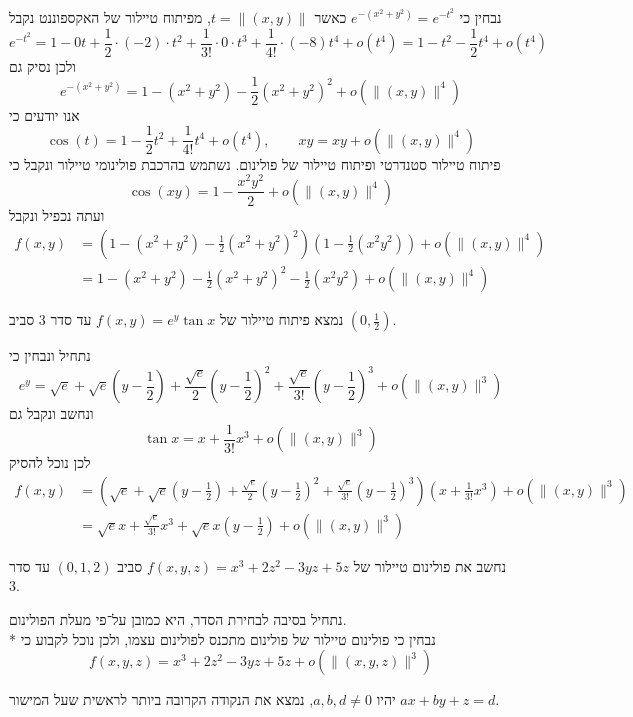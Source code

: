 נבחין כי $e^{-(x^2 + y^2)} = e^{-t^2}$ כאשר $t = \lVert (x, y) \rVert$, מפיתוח טיילור של האקספוננט נקבל
\[
	e^{-t^2} = 1 - 0 t + \frac{1}{2} \cdot (-2) \cdot t^2 + \frac{1}{3!} \cdot 0 \cdot t^3 + \frac{1}{4!} \cdot (-8) t^4 + o(t^4)
	= 1 - t^2 - \frac{1}{2} t^4 + o(t^4)
\]
ולכן נסיק גם
\[
	e^{-(x^2+y^2)} = 1 - (x^2 + y^2) - \frac{1}{2} {(x^2 + y^2)}^2 + o(\lVert (x, y) \rVert^4)
\]
אנו יודעים כי
\[
	\cos(t) = 1 - \frac{1}{2} t^2 + \frac{1}{4!} t^4 + o(t^4),
	\qquad
	xy = xy + o(\lVert (x, y) \rVert^4)
\]
פיתוח טיילור סטנדרטי ופיתוח טיילור של פולינום.
נשתמש בהרכבת פולינומי טיילור ונקבל כי
\[
	\cos(xy) = 1 - \frac{x^2 y^2}{2} + o(\lVert (x, y) \rVert^4)
\]
ועתה נכפיל ונקבל
\begin{align*}
	f(x, y)
	& = (1 - (x^2 + y^2) - \frac{1}{2} {(x^2 + y^2)}^2)(1 - \frac{1}{2}(x^2y^2)) + o(\lVert (x, y) \rVert^4) \\
	& = 1 - (x^2 + y^2) - \frac{1}{2} {(x^2 + y^2)}^2 - \frac{1}{2}(x^2y^2) + o(\lVert (x, y) \rVert^4)
\end{align*}

\Subquestion{}
נמצא פיתוח טיילור של $f(x, y) = e^y \tan x$ עד סדר $3$ סביב $(0, \frac{1}{2})$.

נתחיל ונבחין כי
\[
	e^y = \sqrt{e} + \sqrt{e} (y - \frac{1}{2}) + \frac{\sqrt{e}}{2} {(y - \frac{1}{2})}^2 + \frac{\sqrt{e}}{3!} {(y - \frac{1}{2})}^3 + o(\lVert (x, y) \rVert^3)
\]
ונחשב ונקבל גם
\[
	\tan x = x + \frac{1}{3!} x^3 + o(\lVert (x, y) \rVert^3)
\]
לכן נוכל להסיק
\begin{align*}
	f(x, y)
	& = (\sqrt{e} + \sqrt{e} (y - \frac{1}{2}) + \frac{\sqrt{e}}{2} {(y - \frac{1}{2})}^2 + \frac{\sqrt{e}}{3!} {(y - \frac{1}{2})}^3)(x + \frac{1}{3!} x^3) + o(\lVert (x, y) \rVert^3) \\
	& = \sqrt{e} x + \frac{\sqrt{e}}{3!} x^3 + \sqrt{e} x (y - \frac{1}{2}) + o(\lVert (x, y) \rVert^3)
\end{align*}

\Subquestion{}
נחשב את פולינום טיילור של $f(x, y, z) = x^3 + 2z^2 - 3yz + 5z$ סביב $(0, 1, 2)$ עד סדר $3$.

נתחיל בסיבה לבחירת הסדר, היא כמובן על־פי מעלת הפולינום. \\*
נבחין כי פולינום טיילור של פולינום מתכנס לפולינום עצמו, ולכן נוכל לקבוע כי
\[
	f(x, y, z) = x^3 + 2z^2 - 3yz + 5z + o(\lVert (x, y, z) \rVert^3)
\]

\Question{}
יהיו $a, b, d \ne 0$, נמצא את הנקודה הקרובה ביותר לראשית שעל המישור $ax + by + z = d$.

